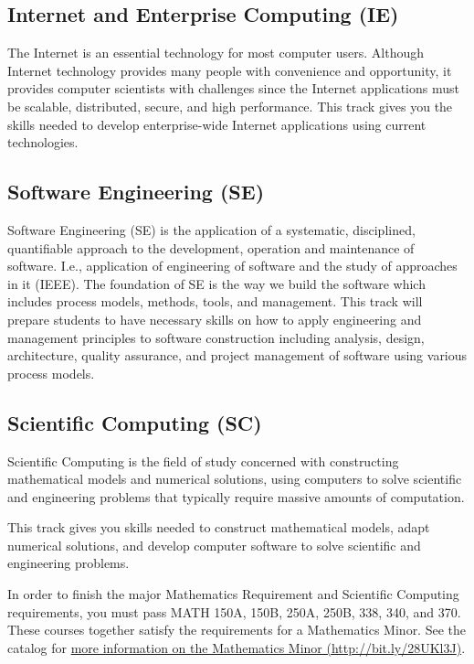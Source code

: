 \documentclass{book}
\newcommand{\IeTrackName}{Internet and Enterprise Computing (IE)}
\newcommand{\SeTrackName}{Software Engineering (SE)}
\newcommand{\ScTrackName}{Scientific Computing (SC)}
\begin{document}
\subsection{\IeTrackName}
\IeTrackIndex
The Internet is an essential technology for most computer users. Although Internet technology provides many people with convenience and opportunity, it provides computer scientists with challenges since the Internet applications must be scalable, distributed, secure, and high performance. This track gives you the skills needed to develop enterprise-wide Internet applications using current technologies.

\subsection{\SeTrackName}
\SeTrackIndex
Software Engineering (SE) is the application of a systematic, disciplined, quantifiable approach to the development, operation and maintenance of software. I.e., application of engineering of software and the study of approaches in it (IEEE).  The foundation of SE is the way we build the software which includes process models, methods, tools, and management.  This track will prepare students to have necessary skills on how to apply engineering and management principles to software construction including analysis, design, architecture, quality assurance, and project management of software using various process models.

\subsection{\ScTrackName}
\ScTrackIndex

Scientific Computing is the field of study concerned with constructing mathematical models and numerical solutions, using computers to solve scientific and engineering problems that typically require massive amounts of computation.

This track gives you skills needed to construct mathematical models, adapt numerical solutions, and develop computer software to solve scientific and engineering problems.

In order to finish the major Mathematics Requirement and Scientific Computing requirements, you must pass MATH 150A, 150B, 250A, 250B, 338, 340, and 370. These courses together satisfy the requirements for a Mathematics Minor. See the catalog for \href{http://catalog.fullerton.edu/preview_program.php?catoid=2&poid=625}{more information on the Mathematics Minor (\url{http://bit.ly/28UKl3J})}.
\end{document}
